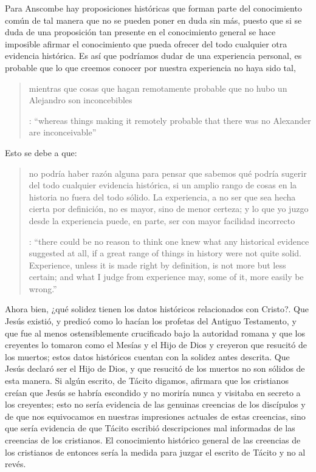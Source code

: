 Para Anscombe hay proposiciones históricas que forman parte del conocimiento común de tal manera que no se pueden poner en duda sin más, puesto que si se duda de una proposición tan presente en el conocimiento general se hace imposible afirmar el conocimiento que pueda ofrecer del todo cualquier otra evidencia histórica. Es así que podríamos dudar de una experiencia personal, es probable que lo que creemos conocer por nuestra experiencia no haya sido tal, \blockquote[{\cite[27]{anscombe2008faith:prophandmi}}: \enquote{whereas things making it remotely probable that there was no Alexander are inconceivable}]{mientras que cosas que hagan remotamente probable que no hubo un Alejandro son inconcebibles}. Esto se debe a que: \blockquote[{\cite[27]{anscombe2008faith:prophandmi}}: \enquote{there could be no reason to think one knew what any historical evidence suggested at all, if a great range of things in history were not quite solid. Experience, unless it is made right by definition, is not more but less certain; and what I judge from experience may, some of it, more easily be wrong.}]{no podría haber razón alguna para pensar que sabemos qué podría sugerir del todo cualquier evidencia histórica, si un amplio rango de cosas en la historia no fuera del todo sólido. La experiencia, a no ser que sea hecha cierta por definición, no es mayor, sino de menor certeza; y lo que yo juzgo desde la experiencia puede, en parte, ser con mayor facilidad incorrecto}.

Ahora bien, ¿qué solidez tienen los datos históricos relacionados con Cristo?. Que Jesús existió, y predicó como lo hacían los profetas del Antiguo Testamento, y que fue al menos ostensiblemente crucificado bajo la autoridad romana y que los creyentes lo tomaron como el Mesías y el Hijo de Dios y creyeron que resucitó de los muertos; estos datos históricos cuentan con la solidez antes descrita. Que Jesús declaró ser el Hijo de Dios, y que resucitó de los muertos no son sólidos de esta manera. Si algún escrito, de Tácito digamos, afirmara que los cristianos creían que Jesús se habría escondido y no moriría nunca y visitaba en secreto a los creyentes; esto no sería evidencia de las genuinas creencias de los discípulos y de que nos equivocamos en nuestras impresiones actuales de estas creencias, sino que sería evidencia de que Tácito escribió descripciones mal informadas de las creencias de los cristianos. El conocimiento histórico general de las creencias de los cristianos de entonces sería la medida para juzgar el escrito de Tácito y no al revés.

